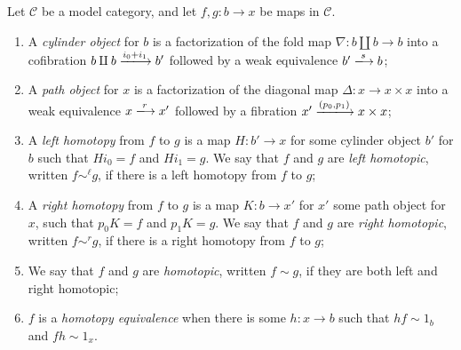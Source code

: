 \begin{definition}[Homotopy]\label{1.2.8}
	Let $\mathcal{C} $ be a model category, and let $f,g : b \to x$ be maps in $\mathcal{C} $.
	\begin{enumerate}
		\item A \emph{cylinder object} for $b$ is a factorization of the fold map $\nabla : b\amalg b \to b$ into a cofibration $b\amalg b\xlongrightarrow{i_0+i_1}b'$ followed by a weak equivalence $b'\xlongrightarrow{s}b$;
		\item A \emph{path object} for $x$ is a factorization of the diagonal map $\Delta : x \to x\times x$ into a weak equivalence $x\xlongrightarrow{r}x'$ followed by a fibration $x'\xlongrightarrow{(p_0,p_1)}x\times x$;
		\item A \emph{left homotopy} from $f$ to $g$ is a map $H : b' \to x$ for some cylinder object $b'$ for $b$ such that $Hi_0=f$ and $Hi_1=g $. We say that $f$ and $g$ are \emph{left homotopic}, written $f\sim ^\ell g$, if there is a left homotopy from $f$ to $g$;
		\item A \emph{right homotopy} from $f$ to $g$ is a map $K : b \to x'$ for $x'$ some path object for $x$, such that $p_0K=f$ and $p_1K=g$. We say that $f$ and $g$ are \emph{right homotopic}, written $f\sim ^r g$, if there is a right homotopy from $f$ to $g$;
		\item We say that $f$ and $g$ are \emph{homotopic}, written $f\sim g$, if they are both left and right homotopic;
		\item $f$ is a \emph{homotopy equivalence} when there is some $h : x \to b$ such that $hf\sim 1_b$ and $fh\sim 1_x$.
	\end{enumerate} 
\end{definition}

